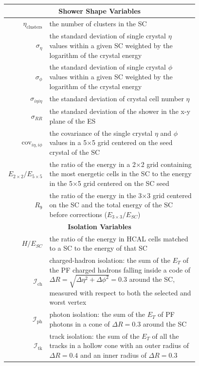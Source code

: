 \begin{table}[htbp]
    \renewcommand{\arraystretch}{1.5} %

    \centering
    \begin{tabular}{|r | p{0.78\linewidth}|}
        \multicolumn{2}{c}{\textbf{Shower Shape Variables}} \\ \hline \hline
        $\eta_{\mathrm{clusters}}$ & the number of clusters in the SC \\ 
        $\sigma_{\eta}$ & the standard deviation of single crystal $\eta$ values within a given SC weighted by the logarithm of the crystal energy \\
        $\sigma_{\phi}$ & the standard deviation of single crystal $\phi$ values within a given SC weighted by the logarithm of the crystal energy \\ 
        $\sigma_{i\eta i\eta}$ & the standard deviation of crystal cell number $\eta$ \\
        $\sigma_{RR}$ & the standard deviation of the shower in the x-y plane of the ES  \\
        cov$_{i\eta,i\phi}$ & the covariance of the single crystal $\eta$ and $\phi$ values in a 5$\times$5 grid centered on the seed crystal of the SC \\
        $E_{2\times2}/E_{5\times5}$ & the ratio of the energy in a 2$\times$2 grid containing the most energetic cells in the SC to the energy in the 5$\times$5 grid centered on the SC seed \\
        $R_9$ & the ratio of the energy in the 3$\times$3 grid centered on the SC and the total energy of the SC before corrections ($E_{3\times3}/E_{SC}$) \\ \hline \hline
        \multicolumn{2}{c}{\textbf{Isolation Variables}} \\ \hline \hline
        $H/E_{SC}$ & the ratio of the energy in HCAL cells matched to a SC to the energy of that SC \\
        $\mathcal{I}_{\mathrm{ch}}$ & charged-hadron isolation: the sum of the $E_T$ of the PF charged hadrons falling inside a code of $\Delta R = \sqrt{\Delta\eta^2 + \Delta\phi^2} = 0.3$ around the SC, measured with respect to both the selected and worst vertex \\ 
        $\mathcal{I}_{\mathrm{ph}}$ & photon isolation: the sum of the $E_T$ of PF photons in a cone of $\Delta R = 0.3$ around the SC \\
        $\mathcal{I}_{\mathrm{tk}}$ & track isolation: the sum of the $E_T$ of all the tracks in a hollow cone with an outer radius of $\Delta R = 0.4$ and an inner radius of $\Delta R = 0.3$ \\ \hline \hline

\end{tabular}
\end{table}
